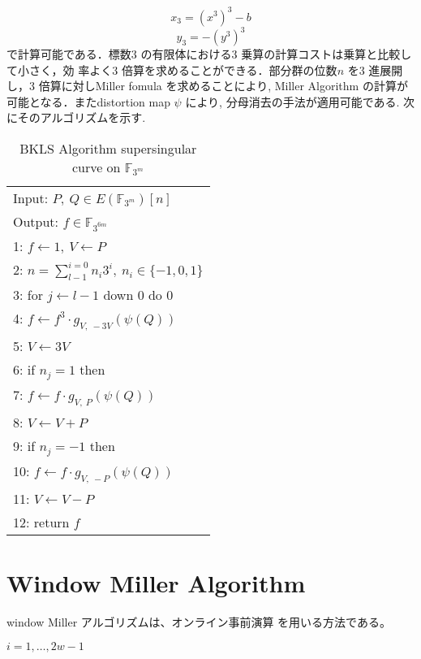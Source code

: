 \vspace{-3mm}
\[
x_3 = (x^3)^3 - b
\]
\vspace{-5mm}
\[
y_3 = - (y^3)^3
\]
\vspace{-3mm}
で計算可能である．標数3 の有限体における3 乗算の計算コストは乗算と比較して小さく，効
率よく3 倍算を求めることができる．部分群の位数$n$ を3 進展開し，3 倍算に対しMiller fomula を求めることにより, Miller Algorithm の計算が可能となる．またdistortion map $\psi$ により, 分母消去の手法が適用可能である. 次にそのアルゴリズムを示す.
\begin{table}[htbp]
 \begin{center}
  \begin{tabular}{|l|}
     \hline
     Input: $P,\ Q \in E(\mathbb{F}_{3^m})[n]$\\
     Output: $f \in \mathbb{F}_{3^{6m}}$\\
     \hline
     1: \quad $f \gets 1,\ V \gets P$\\
     2: \quad $n=\sum_{l-1}^{i=0} n_i 3^i, \ n_i \in \{-1,0,1\}$\\
     3: \quad for $j \gets l-1$ down 0 do 0\\
     4: \quad \quad $f \gets f^3 \cdot g_{V,\ -3V}(\psi (Q))$\\
     5: \quad \quad $V \gets 3V$\\
     6: \quad if $n_j = 1$ then\\
     7: \quad \quad $f \gets f \cdot g_{V,\ P}(\psi (Q))$\\
     8: \quad \quad $V \gets V+P$\\
     9: \quad if $n_j = -1$ then\\
     10: \quad \quad $f \gets f \cdot g_{V,\ -P}(\psi (Q))$\\
     11: \quad \quad $V \gets V-P$\\
     12: \quad return $f$\\
     \hline
   \end{tabular}
 \end{center}
 \caption{BKLS Algorithm supersingular curve on $\mathbb{F}_{3^m}$}
\end{table}
\par
\clearpage


\section{Window Miller Algorithm}
window Miller アルゴリズムは、オンライン事前演算 を用いる方法である。

$i=1,\ldots,2w-1$

